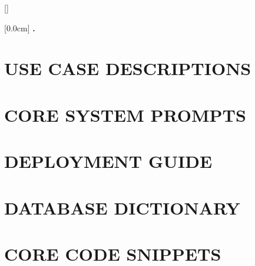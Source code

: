 \documentclass[a4paper,12pt,oneside]{report}
\theoremstyle{definition}
\begin{document}
{}[]
\titlespacing*{\chapter}{0pt}{-20pt}{20pt}

    [0.0cm]             %
    {\bfseries\vspace{0.3cm}}                  %
    {{\bfseries{\scshape} \thecontentslabel.\ }} %
    {}         %
    {\contentspage}         %
\chapter{USE CASE DESCRIPTIONS}


\chapter{CORE SYSTEM PROMPTS}


\chapter{DEPLOYMENT GUIDE}


\chapter{DATABASE DICTIONARY}


\chapter{CORE CODE SNIPPETS}

\end{document}
